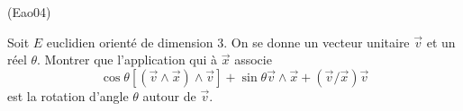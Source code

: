 \begin{tiny}(Eao04)\end{tiny}
Soit $E$ euclidien orienté de dimension 3. On se donne un vecteur unitaire $\overrightarrow{v}$ et un
réel $\theta $. Montrer que l'application qui à $\overrightarrow{x}$
associe
\[
\cos \theta \left[ (\overrightarrow{v}\wedge \overrightarrow{x})\wedge
\overrightarrow{v}\right] +\sin \theta \overrightarrow{v}\wedge
\overrightarrow{x}+(\overrightarrow{v}/ \overrightarrow{x})\overrightarrow{v}
\]
est la rotation d'angle $\theta $ autour de $\overrightarrow{v}$.
